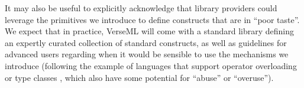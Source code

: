 It may also be useful to explicitly acknowledge that library providers could leverage the primitives we introduce   to define constructs that are in ``poor taste''. We  expect that in practice, VerseML will come with a standard library defining an expertly curated collection of standard constructs, as well as guidelines for advanced users regarding when it would be sensible to use the mechanisms we introduce (following the example of languages that support operator overloading or type classes \cite{Hall:1996:TCH:227699.227700}, which also have some potential for ``abuse'' or ``overuse''). %

